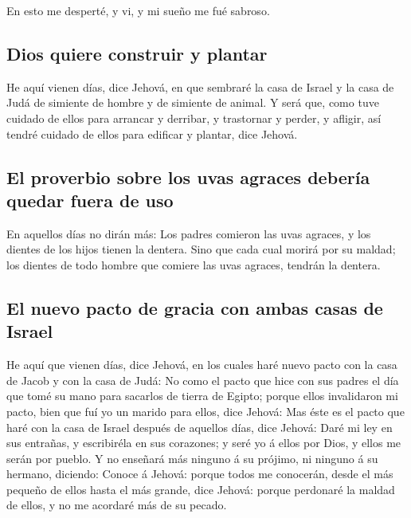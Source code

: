  En esto me desperté, y vi, y mi sueño me fué sabroso.

\hypertarget{dios-quiere-construir-y-plantar}{%
\subsection{Dios quiere construir y
plantar}\label{dios-quiere-construir-y-plantar}}

 He aquí vienen días, dice Jehová, en que sembraré la casa
de Israel y la casa de Judá de simiente de hombre y de simiente de
animal.  Y será que, como tuve cuidado de ellos para
arrancar y derribar, y trastornar y perder, y afligir, así tendré
cuidado de ellos para edificar y plantar, dice Jehová.

\hypertarget{el-proverbio-sobre-los-uvas-agraces-deberuxeda-quedar-fuera-de-uso}{%
\subsection{El proverbio sobre los uvas agraces debería quedar fuera de
uso}\label{el-proverbio-sobre-los-uvas-agraces-deberuxeda-quedar-fuera-de-uso}}

 En aquellos días no dirán más: Los padres comieron las
uvas agraces, y los dientes de los hijos tienen la dentera.
 Sino que cada cual morirá por su maldad; los dientes de
todo hombre que comiere las uvas agraces, tendrán la dentera.

\hypertarget{el-nuevo-pacto-de-gracia-con-ambas-casas-de-israel}{%
\subsection{El nuevo pacto de gracia con ambas casas de
Israel}\label{el-nuevo-pacto-de-gracia-con-ambas-casas-de-israel}}

 He aquí que vienen días, dice Jehová, en los cuales haré
nuevo pacto con la casa de Jacob y con la casa de Judá:  No
como el pacto que hice con sus padres el día que tomé su mano para
sacarlos de tierra de Egipto; porque ellos invalidaron mi pacto, bien
que fuí yo un marido para ellos, dice Jehová:  Mas éste es
el pacto que haré con la casa de Israel después de aquellos días, dice
Jehová: Daré mi ley en sus entrañas, y escribiréla en sus corazones; y
seré yo á ellos por Dios, y ellos me serán por pueblo.  Y
no enseñará más ninguno á su prójimo, ni ninguno á su hermano, diciendo:
Conoce á Jehová: porque todos me conocerán, desde el más pequeño de
ellos hasta el más grande, dice Jehová: porque perdonaré la maldad de
ellos, y no me acordaré más de su pecado.

